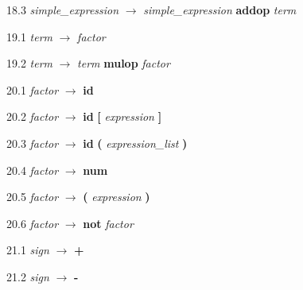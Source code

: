 18.3 \emph{simple\_expression} $\rightarrow$ \emph{simple\_expression} \textbf{addop} \emph{term}

19.1 \emph{term} $\rightarrow$ \emph{factor}

19.2 \emph{term} $\rightarrow$ \emph{term} \textbf{mulop} \emph{factor}

20.1 \emph{factor} $\rightarrow$ \textbf{id}

20.2 \emph{factor} $\rightarrow$ \textbf{id} \textbf{[} \emph{expression} \textbf{]}

20.3 \emph{factor} $\rightarrow$ \textbf{id} \textbf{(} \emph{expression\_list} \textbf{)}

20.4 \emph{factor} $\rightarrow$ \textbf{num}

20.5 \emph{factor} $\rightarrow$ \textbf{(} \emph{expression} \textbf{)}

20.6 \emph{factor} $\rightarrow$ \textbf{not} \emph{factor}

21.1 \emph{sign} $\rightarrow$ \textbf{+}

21.2 \emph{sign} $\rightarrow$ \textbf{-}
%